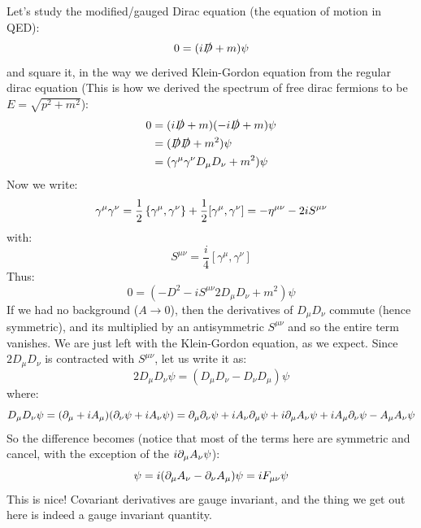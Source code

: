 Let's study the modified/gauged Dirac equation (the equation of motion in QED):
\begin{equation}
    0 = (i\slashed{D} + m)\psi
\end{equation}
and square it, in the way we derived Klein-Gordon equation from the regular dirac equation (This is how we derived the spectrum of free dirac fermions to be $E = \sqrt{p^2 + m^2}$):
\begin{equation}
    \begin{split}
        0 &= (i\slashed{D} + m)(-i\slashed{D} + m)\psi 
        \\ &= (\slashed{D}\slashed{D} + m^2)\psi
        \\ &= (\gamma^\mu\gamma^\nu D_\mu D_\nu + m^2)\psi
    \end{split}
\end{equation}
Now we write:
\begin{equation}
    \gamma^\mu\gamma^\nu = \frac{1}{2}\set{\gamma^\mu, \gamma^\nu} + \frac{1}{2}[\gamma^\mu, \gamma^\nu] = -\eta^{\mu\nu} - 2iS^{\mu\nu}
\end{equation}
with:
\begin{equation}
    S^{\mu\nu} = \frac{i}{4}[\gamma^\mu, \gamma^\nu]
\end{equation}
Thus:
\begin{equation}
    0 = (-D^2 - iS^{\mu\nu}2D_\mu D_\nu + m^2)\psi
\end{equation}
If we had no background ($A \to 0$), then the derivatives of $D_\mu D_\nu$ commute (hence symmetric), and its multiplied by an antisymmetric $S^{\mu\nu}$ and so the entire term vanishes. We are just left with the Klein-Gordon equation, as we expect. Since $2D_\mu D_\nu$ is contracted with $S^{\mu\nu}$, let us write it as:
\begin{equation}
    2D_{\mu}D_\nu \psi = (D_\mu D_\nu - D_\nu D_\mu)\psi
\end{equation}
where:
\begin{equation}
    D_\mu D_\nu \psi =  (\partial_\mu + iA_\mu)(\partial_\nu \psi + iA_\nu \psi) = \partial_\mu \partial_\nu \psi + i A_\nu \partial_\mu \psi + i \partial_\mu A_\nu \psi + i A_\mu \partial_\nu \psi - A_\mu A_\nu \psi
\end{equation}
So the difference becomes (notice that most of the terms here are symmetric and cancel, with the exception of the $i\partial_\mu A_\nu \psi$):
\begin{equation}
    [D_\mu, D_\nu]\psi = i(\p_\mu A_\nu - \p_\nu A_\mu)\psi = iF_{\mu\nu}\psi
\end{equation}
This is nice! Covariant derivatives are gauge invariant, and the thing we get out here is indeed a gauge invariant quantity.

